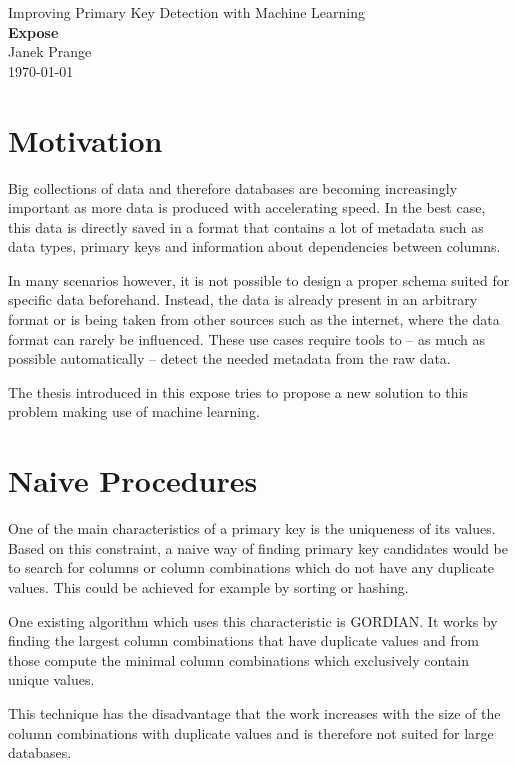 \documentclass[a4paper]{article}
\begin{document}
\thispagestyle{firstpagestyle}
\begin{center}
  \huge Improving Primary Key Detection with Machine Learning\\[8pt]
  \Large \textbf{Expose}\\[10pt]
  \normalsize Janek Prange\\
  \today
\end{center}

\section{Motivation}
Big collections of data and therefore databases are becoming increasingly important as more data is produced with accelerating speed. In the best case, this data is directly saved in a format that contains a lot of metadata such as data types, primary keys and information about dependencies between columns.

In many scenarios however, it is not possible to design a proper schema suited for specific data beforehand. Instead, the data is already present in an arbitrary format or is being taken from other sources such as the internet, where the data format can rarely be influenced. These use cases require tools to -- as much as possible automatically -- detect the needed metadata from the raw data. %

The thesis introduced in this expose tries to propose a new solution to this problem making use of machine learning.


\section{Naive Procedures}\label{sec:naiveProcedures}
One of the main characteristics of a primary key is the uniqueness of its values. Based on this constraint, a naive way of finding primary key candidates would be to search for columns or column combinations which do not have any duplicate values. This could be achieved for example by sorting or hashing.

One existing algorithm which uses this characteristic is GORDIAN. It works by finding the largest column combinations that have duplicate values and from those compute the minimal column combinations which exclusively contain unique values.

This technique has the disadvantage that the work increases with the size of the column combinations with duplicate values and is therefore not suited for large databases.
\end{document}
